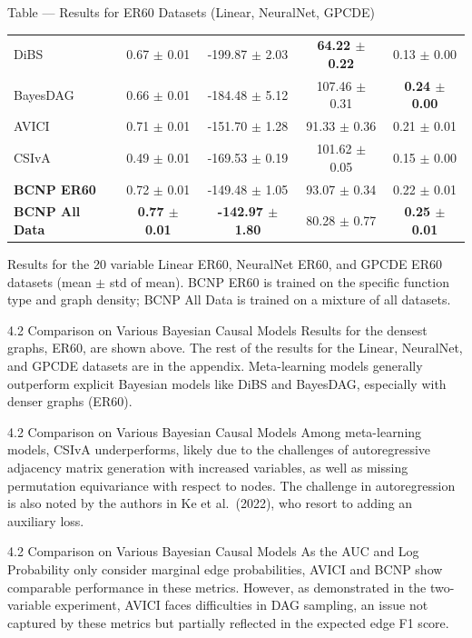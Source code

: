 \documentclass[aspectratio=169,10pt]{beamer}
\begin{document}
\begin{frame}{Table --- Results for ER60 Datasets (Linear, NeuralNet, GPCDE)}
\begin{tabular}{lcccc}
\midrule
DiBS & 0.67 $\pm$ 0.01 & -199.87 $\pm$ 2.03 & \textbf{64.22 $\pm$ 0.22} & 0.13 $\pm$ 0.00 \\
BayesDAG & 0.66 $\pm$ 0.01 & -184.48 $\pm$ 5.12 & 107.46 $\pm$ 0.31 & \textbf{0.24 $\pm$ 0.00} \\
AVICI & 0.71 $\pm$ 0.01 & -151.70 $\pm$ 1.28 & 91.33 $\pm$ 0.36 & 0.21 $\pm$ 0.01 \\
CSIvA & 0.49 $\pm$ 0.01 & -169.53 $\pm$ 0.19 & 101.62 $\pm$ 0.05 & 0.15 $\pm$ 0.00 \\
\textbf{BCNP ER60} & 0.72 $\pm$ 0.01 & -149.48 $\pm$ 1.05 & 93.07 $\pm$ 0.34 & 0.22 $\pm$ 0.01 \\
\textbf{BCNP All Data} & \textbf{0.77 $\pm$ 0.01} & \textbf{-142.97 $\pm$ 1.80} & 80.28 $\pm$ 0.77 & \textbf{0.25 $\pm$ 0.01} \\
\bottomrule
\end{tabular}

\vspace{0.2cm}
{\footnotesize Results for the 20 variable Linear ER60, NeuralNet ER60, and GPCDE ER60 datasets (mean $\pm$ std of mean). BCNP ER60 is trained on the specific function type and graph density; BCNP All Data is trained on a mixture of all datasets.}
\end{frame}

\begin{frame}{4.2 Comparison on Various Bayesian Causal Models}
\small
Results for the densest graphs, ER60, are shown above. The rest of the results for the Linear, NeuralNet, and GPCDE datasets are in the appendix. Meta-learning models generally outperform explicit Bayesian models like DiBS and BayesDAG, especially with denser graphs (ER60).
\end{frame}

\begin{frame}{4.2 Comparison on Various Bayesian Causal Models}
\small
Among meta-learning models, CSIvA underperforms, likely due to the challenges of autoregressive adjacency matrix generation with increased variables, as well as missing permutation equivariance with respect to nodes. The challenge in autoregression is also noted by the authors in Ke et al.\ (2022), who resort to adding an auxiliary loss.
\end{frame}

\begin{frame}{4.2 Comparison on Various Bayesian Causal Models}
\small
As the AUC and Log Probability only consider marginal edge probabilities, AVICI and BCNP show comparable performance in these metrics. However, as demonstrated in the two-variable experiment, AVICI faces difficulties in DAG sampling, an issue not captured by these metrics but partially reflected in the expected edge F1 score.
\end{frame}
\end{document}
